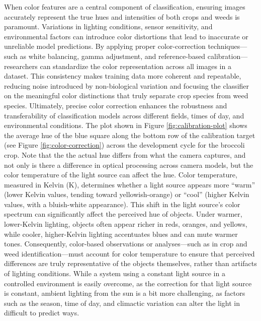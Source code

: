 \documentclass[letterpaper, notitlepage]{report}
\begin{document}
When color features are a central component of classification, ensuring images accurately represent the true hues and intensities of both crops and weeds is paramount. Variations in lighting conditions, sensor sensitivity, and environmental factors can introduce color distortions that lead to inaccurate or unreliable model predictions. By applying proper color-correction techniques—such as white balancing, gamma adjustment, and reference-based calibration—researchers can standardize the color representation across all images in a dataset. This consistency makes training data more coherent and repeatable, reducing noise introduced by non-biological variation and focusing the classifier on the meaningful color distinctions that truly separate crop species from weed species. Ultimately, precise color correction enhances the robustness and transferability of classification models across different fields, times of day, and environmental conditions. The plot shown in Figure \ref{fig:calibration-plot} shows the average hue of the blue square along the bottom row of the calibration target (see Figure \ref{fig:color-correction}) across the development cycle for the broccoli crop. Note that the the actual hue differs from what the camera captures, and not only is there a difference in optical processing across camera models, but the color temperature of the light source can affect the hue. Color temperature, measured in Kelvin (K), determines whether a light source appears more “warm” (lower Kelvin values, tending toward yellowish-orange) or “cool” (higher Kelvin values, with a bluish-white appearance). This shift in the light source’s color spectrum can significantly affect the perceived hue of objects. Under warmer, lower-Kelvin lighting, objects often appear richer in reds, oranges, and yellows, while cooler, higher-Kelvin lighting accentuates blues and can mute warmer tones. Consequently, color-based observations or analyses—such as in crop and weed identification—must account for color temperature to ensure that perceived differences are truly representative of the objects themselves, rather than artifacts of lighting conditions. While a system using a constant light source in a controlled environment is easily overcome, as the correction for that light source is constant, ambient lighting from the sun is a bit more challenging, as factors such as the season, time of day, and climactic variation can alter the light in difficult to predict ways.
\end{document}
